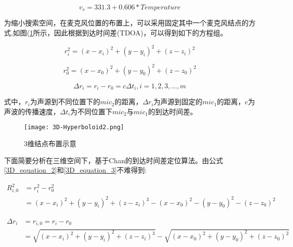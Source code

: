\documentclass[winfonts,oneside]{njuthesis}
\begin{document}
		\begin{equation}
		   v_s = 331.3 + 0.606 * Temperature \label{v_speed}
		\end{equation}
		
		为缩小搜索空间，在麦克风位置的布置上，可以采用固定其中一个麦克风结点的方式,如图(\ref{fig: 3D-Hyperboloid2}所示，因此根据到达时间差(TDOA)，可以得到如下的方程组。
		
		\begin{equation}
			 r_i^2 = (x-x_i)^2 + (y-y_i)^2 + (z-z_i)^2 \label{3D_equation_2}
		\end{equation}
		
		\begin{equation}
			r_0^2 = (x-x_0)^2 + (y-y_0)^2 + (z-z_0)^2 \label{3D_equation_3}
		\end{equation}
		
		\begin{equation}
			\Delta r_i = r_i - r_0 = c\Delta t_i, i = 1,2,3,...,m \label{3D_equation_4}
		\end{equation}
		
		式中，$r_i$为声源到不同位置下的$mic_2$的距离，$\Delta r_i$为声源到固定的$mic_1$的距离，c为声波的传播速度，$\Delta t_i$为不同位置下$mic_2$与$mic_1$的到达时间差。
		
		\begin{figure}[H]
			\centering
			\texttt{[image: 3D-Hyperboloid2.png]} 
			\caption{3维结点布置示意}
			\label{fig: 3D-Hyperboloid2}
		\end{figure}
		
		下面简要分析在三维空间下，基于Chan的到达时间差定位算法\cite{Chan3DTDOA}。由公式\ref{3D_equation_2}和\ref{3D_equation_3}不难得到:
		
		\begin{equation}
		\begin{aligned}
			R_{i,0}^2 & = r_i^2 - r_0^2 \\
					  &	= (x-x_i)^2 + (y-y_i)^2 + (z-z_i)^3 - (x-x_0)^2 - (y-y_0)^2 - (z-z_0)^2
		\end{aligned}
		\end{equation}
		
		\begin{equation}
		\begin{aligned}
			\Delta r_i & = r_{i,0} = r_i - r_0\\	
			  		   & = \sqrt{(x-x_i)^2 + (y-y_i)^2 + (z-z_i)^3} - \sqrt{(x-x_0)^2 + (y-y_0)^2 + (z-z_0)^2}  
		\end{aligned}
		\end{equation}
		
\end{document}
